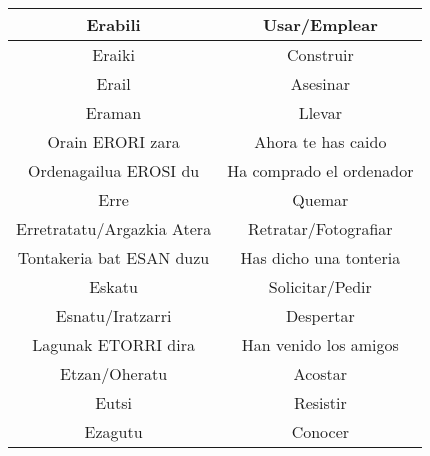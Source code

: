 \documentclass[11pt, a4paper]{article}
\begin{document}
\begin{table}[h]
\begin{tabular}{cc}
		                        Erabili                          &                          Usar/Emplear                          \\ \hline
		                         Eraiki                          &                           Construir                            \\ \hline
		                         Erail                           &                            Asesinar                            \\ \hline
		                         Eraman                          &                             Llevar                             \\ \hline
		                    Orain ERORI zara                     &                       Ahora te has caido                       \\ \hline
		                 Ordenagailua EROSI du                   &                    Ha comprado el ordenador                    \\ \hline
		                          Erre                           &                             Quemar                             \\ \hline
		               Erretratatu/Argazkia Atera                &                      Retratar/Fotografiar                      \\ \hline
		                Tontakeria bat ESAN duzu                 &                     Has dicho una tonteria                     \\ \hline
		                         Eskatu                          &                        Solicitar/Pedir                         \\ \hline
		                    Esnatu/Iratzarri                     &                           Despertar                            \\ \hline
		                  Lagunak ETORRI dira                    &                     Han venido los amigos                      \\ \hline
		                     Etzan/Oheratu                       &                            Acostar                             \\ \hline
		                         Eutsi                           &                            Resistir                            \\ \hline
		                        Ezagutu                          &                            Conocer                             \\ \hline

\end{tabular}
\end{table}
\end{document}
